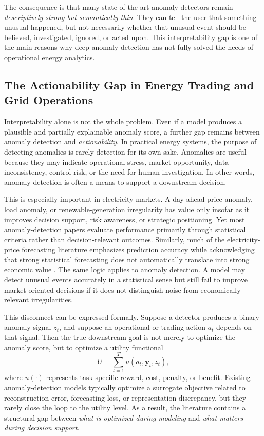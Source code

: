 The consequence is that many state-of-the-art anomaly detectors remain \emph{descriptively strong but semantically thin}. They can tell the user that something unusual happened, but not necessarily whether that unusual event should be believed, investigated, ignored, or acted upon. This interpretability gap is one of the main reasons why deep anomaly detection has not fully solved the needs of operational energy analytics.

\subsection{The Actionability Gap in Energy Trading and Grid Operations}

Interpretability alone is not the whole problem. Even if a model produces a plausible and partially explainable anomaly score, a further gap remains between anomaly detection and \emph{actionability}. In practical energy systems, the purpose of detecting anomalies is rarely detection for its own sake. Anomalies are useful because they may indicate operational stress, market opportunity, data inconsistency, control risk, or the need for human investigation. In other words, anomaly detection is often a means to support a downstream decision.

This is especially important in electricity markets. A day-ahead price anomaly, load anomaly, or renewable-generation irregularity has value only insofar as it improves decision support, risk awareness, or strategic positioning. Yet most anomaly-detection papers evaluate performance primarily through statistical criteria rather than decision-relevant outcomes. Similarly, much of the electricity-price forecasting literature emphasizes prediction accuracy while acknowledging that strong statistical forecasting does not automatically translate into strong economic value \cite{weron2014electricity,lago2021forecasting}. The same logic applies to anomaly detection. A model may detect unusual events accurately in a statistical sense but still fail to improve market-oriented decisions if it does not distinguish noise from economically relevant irregularities.

This disconnect can be expressed formally. Suppose a detector produces a binary anomaly signal $z_t$, and suppose an operational or trading action $a_t$ depends on that signal. Then the true downstream goal is not merely to optimize the anomaly score, but to optimize a utility functional
\begin{equation}
	U = \sum_{t=1}^{T} u(a_t, \mathbf{y}_t, z_t),
	\label{eq:gap_utility}
\end{equation}
where $u(\cdot)$ represents task-specific reward, cost, penalty, or benefit. Existing anomaly-detection models typically optimize a surrogate objective related to reconstruction error, forecasting loss, or representation discrepancy, but they rarely close the loop to the utility level. As a result, the literature contains a structural gap between \emph{what is optimized during modeling} and \emph{what matters during decision support}.

